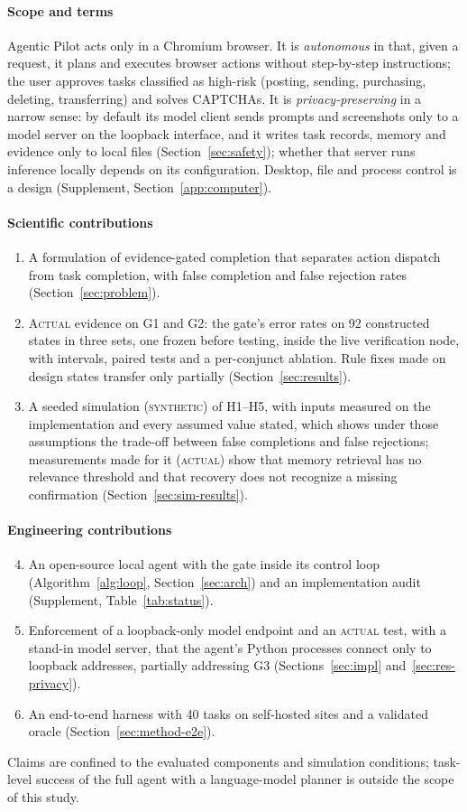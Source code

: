 \paragraph{Scope and terms} Agentic Pilot acts only in a Chromium browser. It is \emph{autonomous} in that, given a request, it plans and executes browser actions without step-by-step instructions; the user approves tasks classified as high-risk (posting, sending, purchasing, deleting, transferring) and solves CAPTCHAs. It is \emph{privacy-preserving} in a narrow sense: by default its model client sends prompts and screenshots only to a model server on the loopback interface, and it writes task records, memory and evidence only to local files (Section~\ref{sec:safety}); whether that server runs inference locally depends on its configuration. Desktop, file and process control is a design (Supplement, Section~\ref{app:computer}).


\paragraph{Scientific contributions}
\begin{enumerate}
\item A formulation of evidence-gated completion that separates action dispatch from task completion, with false completion and false rejection rates (Section~\ref{sec:problem}).
\item \textsc{Actual} evidence on G1 and G2: the gate's error rates on 92 constructed states in three sets, one frozen before testing, inside the live verification node, with intervals, paired tests and a per-conjunct ablation. Rule fixes made on design states transfer only partially (Section~\ref{sec:results}).
\item A seeded simulation (\textsc{synthetic}) of H1--H5, with inputs measured on the implementation and every assumed value stated, which shows under those assumptions the trade-off between false completions and false rejections; measurements made for it (\textsc{actual}) show that memory retrieval has no relevance threshold and that recovery does not recognize a missing confirmation (Section~\ref{sec:sim-results}).
\end{enumerate}

\paragraph{Engineering contributions}
\begin{enumerate}
\setcounter{enumi}{3}
\item An open-source local agent with the gate inside its control loop (Algorithm~\ref{alg:loop}, Section~\ref{sec:arch}) and an implementation audit (Supplement, Table~\ref{tab:status}).
\item Enforcement of a loopback-only model endpoint and an \textsc{actual} test, with a stand-in model server, that the agent's Python processes connect only to loopback addresses, partially addressing G3 (Sections~\ref{sec:impl} and~\ref{sec:res-privacy}).
\item An end-to-end harness with 40 tasks on self-hosted sites and a validated oracle (Section~\ref{sec:method-e2e}).
\end{enumerate}

Claims are confined to the evaluated components and simulation conditions; task-level success of the full agent with a language-model planner is outside the scope of this study.
